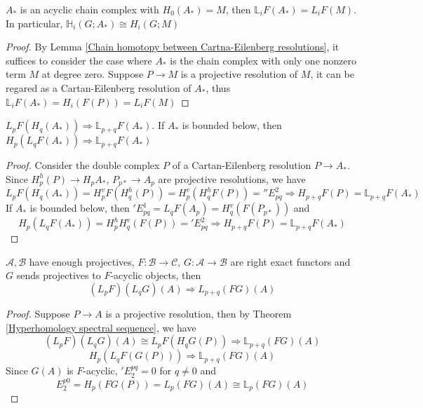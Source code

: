 \documentclass[../main.tex]{subfiles}
\begin{document}
\begin{lemma}\label{Hyperhomology of an acyclic chain complex is the same as homology}
$A_*$ is an acyclic chain complex with $H_0(A_*)=M$, then $\mathbb L_iF(A_*)=L_iF(M)$. In particular, $\mathbb H_i(G;A_*)\cong H_i(G;M)$
\end{lemma}

\begin{proof}
By Lemma \ref{Chain homotopy between Cartna-Eilenberg resolutions}, it suffices to consider the case where $A_*$ is the chain complex with only one nonzero term $M$ at degree zero. Suppose $P\to M$ is a projective resolution of $M$, it can be regared as a Cartan-Eilenberg resolution of $A_*$, thus $\mathbb L_iF(A_*)=H_i(F(P))=L_iF(M)$
\end{proof}

\begin{theorem}\label{Hyperhomology spectral sequence}
$L_pF(H_q(A_*))\Rightarrow\mathbb L_{p+q}F(A_*)$. If $A_*$ is bounded below, then $H_p(L_qF(A_*))\Rightarrow\mathbb L_{p+q}F(A_*)$
\end{theorem}

\begin{proof}
Consider the double complex $P$ of a Cartan-Eilenberg resolution $P\to A_*$. Since $H^h_p(P)\to H_pA_*$, $P_{p*}\to A_p$ are projective resolutions, we have
\[L_pF(H_q(A_*))=H^v_pF(H^h_q(P))=H^v_p(H^h_qF(P))=''E^2_{pq}\Rightarrow H_{p+q}F(P)=\mathbb L_{p+q}F(A_*)\]
If $A_*$ is bounded below, then $'E^1_{pq}=L_qF(A_p)=H^v_q(F(P_{p*}))$ and
\[H_p(L_qF(A_*))=H^h_pH^v_q(F(P))='E^2_{pq}\Rightarrow H_{p+q}F(P)=\mathbb L_{p+q}F(A_*)\]
\end{proof}

\begin{theorem}\label{Grothendieck spectral sequence}
$\mathcal A,\mathcal B$ have enough projectives, $F:\mathcal B\to\mathcal C$, $G:\mathcal{A}\to \mathcal{B}$ are right exact functors and $G$ sends projectives to $F$-acyclic objects, then
\[(L_pF)(L_qG)(A)\Rightarrow L_{p+q}(FG)(A)\]
\end{theorem}

\begin{proof}
Suppose $P\to A$ is a projective resolution, then by Theorem \ref{Hyperhomology spectral sequence}, we have
\[(L_pF)(L_qG)(A)\cong L_pF(H_qG(P))\Rightarrow \mathbb L_{p+q}(FG)(A)\]
\[H_p(L_qF(G(P)))\Rightarrow \mathbb L_{p+q}(FG)(A)\]
Since $G(A)$ is $F$-acyclic, $'E^{pq}_2=0$ for $q\neq0$ and
\[E^{p0}_2=H_p(FG(P))=L_p(FG)(A)\cong\mathbb L_p(FG)(A)\]
\end{proof}
\end{document}
